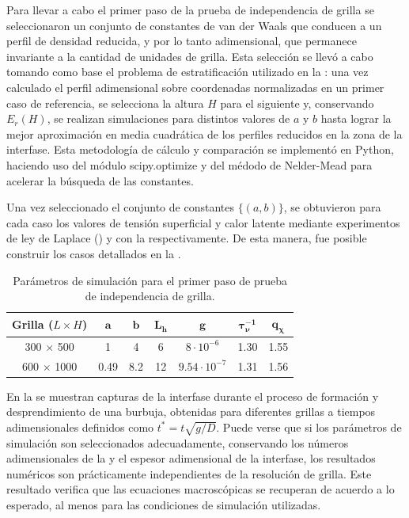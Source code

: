 Para llevar a cabo el primer paso de la prueba de independencia de grilla se seleccionaron un conjunto de constantes de van der Waals que conducen a un perfil de densidad reducida, y por lo tanto adimensional, que permanece invariante a la cantidad de unidades de grilla. Esta selecci\'on se llev\'o a cabo tomando como base el problema de estratificaci\'on utilizado en la : una vez calculado el perfil adimensional sobre coordenadas normalizadas en un primer caso de referencia, se selecciona la altura $H$ para el siguiente y, conservando $E_r(H)$, se realizan simulaciones para distintos valores de $a$ y $b$ hasta lograr la mejor aproximaci\'on en media cuadr\'atica de los perfiles reducidos en la zona de la interfase. Esta metodolog\'ia  de c\'alculo y comparaci\'on se implement\'o en Python, haciendo uso del m\'odulo scipy.optimize y del m\'edodo de Nelder-Mead para acelerar la b\'usqueda de las constantes.

Una vez seleccionado el conjunto de constantes $\{(a,b)\}$, se obtuvieron para cada caso los valores de tensi\'on superficial y calor latente mediante experimentos de ley de Laplace () y con la  respectivamente. De esta manera, fue posible construir los casos detallados en la .
\begin{table}[ht]
	\centering
    \begin{tabular}{c c c c c c c}
	    \toprule
        \bf Grilla ($L\times H$) & $\bm{a}$ & $\bm{b}$ & $\bm{L_h}$ & $\bm{g}$ & $\bm{\tau_{\nu}^{-1}}$ & $\bm{q_{\chi}}$ \\
        \midrule
		300 $\times$ 500   & 1 & 4 & 6 & $8\cdot 10^{-6}$ & 1.30 & 1.55 \\
		600 $\times$ 1000  & 0.49 & 8.2 & 12 & $9.54\cdot 10^{-7}$ & 1.31 & 1.56 \\		
        \bottomrule
	\end{tabular}
	\caption{Par\'ametros de simulaci\'on para el primer paso de prueba de independencia de grilla.}
	\label{tab:gridindep_step1}
\end{table}  

En la  se muestran capturas de la interfase durante el proceso de formaci\'on y desprendimiento de una burbuja, obtenidas para diferentes grillas a tiempos adimensionales definidos como $t^* = t \sqrt{g/D}$. Puede verse que si los par\'ametros de simulaci\'on son seleccionados adecuadamente, conservando los n\'umeros adimensionales de la  y el espesor adimensional de la interfase, los resultados num\'ericos son pr\'acticamente independientes de la resoluci\'on de grilla. Este resultado verifica que las ecuaciones macrosc\'opicas se recuperan de acuerdo a lo esperado, al menos para las condiciones de simulaci\'on utilizadas.


